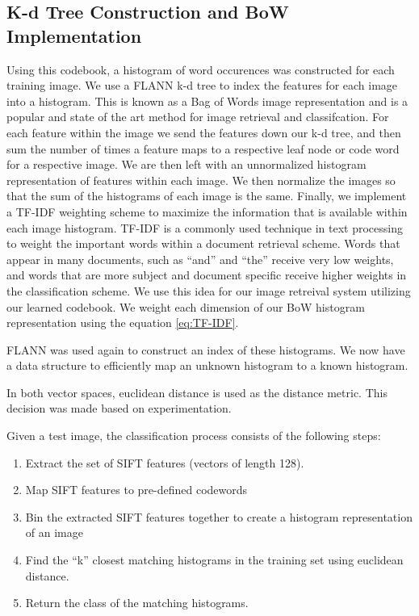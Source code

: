 \subsection{K-d Tree Construction and BoW Implementation}
Using this codebook, a histogram of word occurences was constructed for each training image. 
We use a FLANN k-d tree to index the features for each image into a histogram.
This is known as a Bag of Words image representation and is a popular and state of the art method for image retrieval and classifcation.
For each feature within the image we send the features down our k-d tree, and then sum the number of times a feature maps to a respective leaf node or code word for a respective image.
We are then left with an unnormalized histogram representation of features within each image.
We then normalize the images so that the sum of the histograms of each image is the same.
Finally, we implement a TF-IDF weighting scheme to maximize the information that is available within each image histogram.
TF-IDF is a commonly used technique in text processing to weight the important words within a document retrieval scheme.  
Words that appear in many documents, such as ``and'' and ``the'' receive very low weights, and words that are more subject and document specific receive higher weights in the classification scheme.
We use this idea for our image retreival system utilizing our learned codebook.
We weight each dimension of our BoW histogram representation using the equation \ref{eq:TF-IDF}.

FLANN was used again to construct an index of these histograms. 
We now have a data structure to efficiently map an unknown histogram to a known histogram.


In both vector spaces, euclidean distance is used as the distance metric. 
This decision was made based on experimentation.

Given a test image, the classification process consists of the following steps:
\begin{enumerate}
\item Extract the set of SIFT features (vectors of length 128).

\item Map SIFT features to pre-defined codewords

\item Bin the extracted SIFT features together to create a histogram representation of an image

\item Find the ``k'' closest matching histograms in the training set using euclidean distance.

\item Return the class of the matching histograms.
\end{enumerate}

